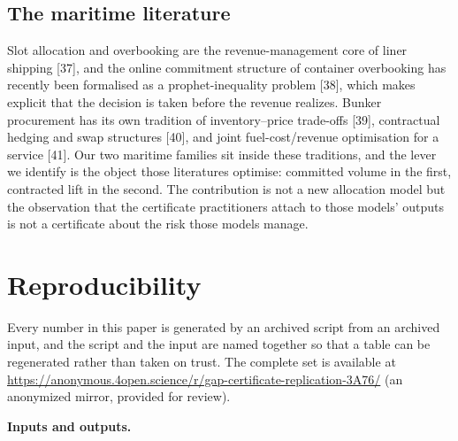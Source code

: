 \documentclass[preprint,12pt,letterpaper]{elsarticle}
\theoremstyle{definition}
\theoremstyle{plain}
\begin{document}
\subsection{The maritime literature}

Slot allocation and overbooking are the revenue-management core of liner shipping [37], and the online commitment structure of container overbooking has recently been formalised as a prophet-inequality problem [38], which makes explicit that the decision is taken before the revenue realizes. Bunker procurement has its own tradition of inventory--price trade-offs [39], contractual hedging and swap structures [40], and joint fuel-cost/revenue optimisation for a service [41]. Our two maritime families sit inside these traditions, and the lever we identify is the object those literatures optimise: committed volume in the first, contracted lift in the second. The contribution is not a new allocation model but the observation that the certificate practitioners attach to those models' outputs is not a certificate about the risk those models manage.

\section{Reproducibility}

Every number in this paper is generated by an archived script from an archived input, and the script and the input are named together so that a table can be regenerated rather than taken on trust. The complete set is available at \url{https://anonymous.4open.science/r/gap-certificate-replication-3A76/} (an anonymized mirror, provided for review).

\textbf{Inputs and outputs.}
\end{document}
